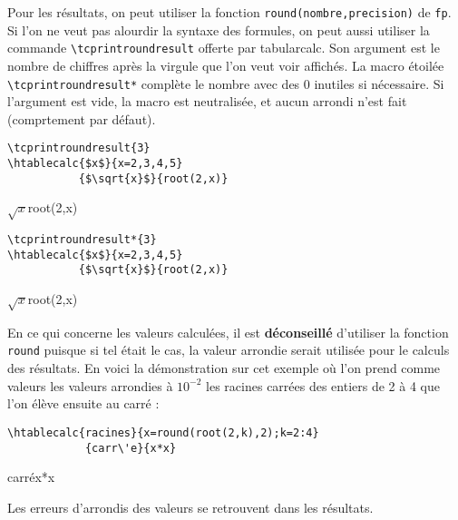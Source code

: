 \documentclass[a4paper,10pt]{article}
\newcommand\tbcalc{\textsf{tabularcalc}\xspace}
\newcommand\verbinline{\lstinline[breaklines=false,basicstyle=\normalsize\ttfamily]}
\begin{document}
Pour les résultats, on peut utiliser la fonction \verb|round(nombre,precision)| de \verb|fp|. Si l'on ne veut pas alourdir la syntaxe des formules, on peut aussi utiliser la commande \verbinline|\tcprintroundresult| offerte par \tbcalc. Son argument est le nombre de chiffres après la virgule que l'on veut voir affichés. La macro étoilée \verbinline|\tcprintroundresult*| complète le nombre avec des 0 inutiles si nécessaire. Si l'argument est vide, la macro est neutralisée, et aucun arrondi n'est fait (comprtement par défaut).
\begin{center}
\begin{minipage}{0.5\linewidth}
\begin{center}
\begin{lstlisting}
\tcprintroundresult{3}
\htablecalc{$x$}{x=2,3,4,5}
           {$\sqrt{x}$}{root(2,x)}
\end{lstlisting}
           {$\sqrt{x}$}{root(2,x)}
\end{center}
\end{minipage}%
\begin{minipage}{0.5\linewidth}
\begin{center}
\begin{lstlisting}
\tcprintroundresult*{3}
\htablecalc{$x$}{x=2,3,4,5}
           {$\sqrt{x}$}{root(2,x)}
\end{lstlisting}
           {$\sqrt{x}$}{root(2,x)}
\end{center}
\end{minipage}
\end{center}

En ce qui concerne les valeurs calculées, il est \textbf{déconseillé} d'utiliser la fonction \verb|round| puisque si tel était le cas, la valeur arrondie serait utilisée pour le calculs des résultats. En voici la démonstration sur cet exemple où l'on prend comme valeurs les valeurs arrondies à $10^{-2}$ les racines carrées des entiers de 2 à 4 que l'on élève ensuite au carré :
\begin{center}
\begin{minipage}{0.75\linewidth}
\begin{lstlisting}
\htablecalc{racines}{x=round(root(2,k),2);k=2:4}
            {carr\'e}{x*x}
\end{lstlisting}
\end{minipage}

            {carr\'e}{x*x}
\end{center}
Les erreurs d'arrondis des valeurs se retrouvent dans les résultats.
\end{document}
